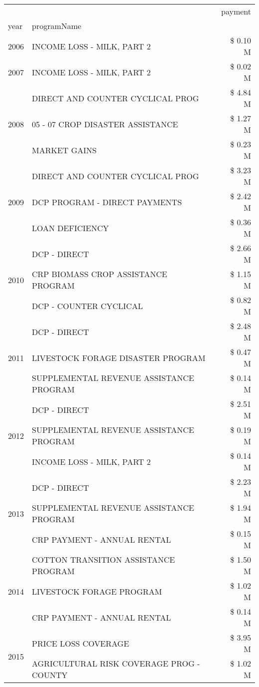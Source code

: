 \begin{tabular}{llr}
\toprule
 &  & payment \\
year & programName &  \\
\midrule
2006 & INCOME LOSS - MILK, PART 2 & \$ 0.10 M \\
\cline{1-3}
2007 & INCOME LOSS - MILK, PART 2 & \$ 0.02 M \\
\cline{1-3}
\multirow[t]{3}{*}{2008} & DIRECT AND COUNTER CYCLICAL PROG & \$ 4.84 M \\
 & 05 - 07 CROP DISASTER ASSISTANCE & \$ 1.27 M \\
 & MARKET GAINS & \$ 0.23 M \\
\cline{1-3}
\multirow[t]{3}{*}{2009} & DIRECT AND COUNTER CYCLICAL PROG & \$ 3.23 M \\
 & DCP PROGRAM - DIRECT PAYMENTS & \$ 2.42 M \\
 & LOAN DEFICIENCY & \$ 0.36 M \\
\cline{1-3}
\multirow[t]{3}{*}{2010} & DCP - DIRECT & \$ 2.66 M \\
 & CRP BIOMASS CROP ASSISTANCE PROGRAM & \$ 1.15 M \\
 & DCP - COUNTER CYCLICAL & \$ 0.82 M \\
\cline{1-3}
\multirow[t]{3}{*}{2011} & DCP - DIRECT & \$ 2.48 M \\
 & LIVESTOCK FORAGE DISASTER PROGRAM & \$ 0.47 M \\
 & SUPPLEMENTAL REVENUE ASSISTANCE PROGRAM & \$ 0.14 M \\
\cline{1-3}
\multirow[t]{3}{*}{2012} & DCP - DIRECT & \$ 2.51 M \\
 & SUPPLEMENTAL REVENUE ASSISTANCE PROGRAM & \$ 0.19 M \\
 & INCOME LOSS - MILK, PART 2 & \$ 0.14 M \\
\cline{1-3}
\multirow[t]{3}{*}{2013} & DCP - DIRECT & \$ 2.23 M \\
 & SUPPLEMENTAL REVENUE ASSISTANCE PROGRAM & \$ 1.94 M \\
 & CRP PAYMENT - ANNUAL RENTAL & \$ 0.15 M \\
\cline{1-3}
\multirow[t]{3}{*}{2014} & COTTON TRANSITION ASSISTANCE PROGRAM & \$ 1.50 M \\
 & LIVESTOCK FORAGE PROGRAM & \$ 1.02 M \\
 & CRP PAYMENT - ANNUAL RENTAL & \$ 0.14 M \\
\cline{1-3}
\multirow[t]{3}{*}{2015} & PRICE LOSS COVERAGE & \$ 3.95 M \\
 & AGRICULTURAL RISK COVERAGE PROG - COUNTY & \$ 1.02 M \\

\end{tabular}
